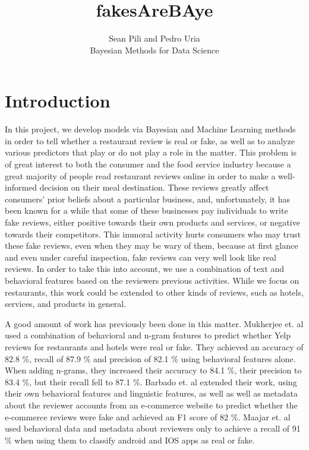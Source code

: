 \documentclass[man, floatsintext, 10pt]{apa6}
\title{fakesAreBAye}
\author{Sean Pili and Pedro Uria \\ Bayesian Methods for Data Science}
\affiliation{GWU}
\begin{document}
\maketitle

\section{Introduction}

In this project, we develop models via Bayesian and Machine Learning methods in order to tell whether a restaurant review is real or fake, as well as to analyze various predictors that play or do not play a role in the matter. This problem is of great interest to both the consumer and the food service industry because a great majority of people read restaurant reviews online in order to make a well-informed decision on their meal destination. These reviews greatly affect consumers' prior beliefs about a particular business, and, unfortunately, it has been known for a while that some of these businesses pay individuals to write fake reviews, either positive towards their own products and services, or negative towards their competitors. This immoral activity hurts consumers who may trust these fake reviews, even when they may be wary of them, because at first glance and even under careful inspection, fake reviews can very well look like real reviews. In order to take this into account, we use a combination of text and behavioral features based on the reviewers previous activities. While we focus on restaurants, this work could be extended to other kinds of reviews, such as hotels, services, and products in general.

A good amount of work has previously been done in this matter. Mukherjee et. al used a combination of behavioral and n-gram features to predict whether Yelp reviews for restaurants and hotels were real or fake. They achieved an accuracy of 82.8 \%, recall of 87.9 \% and precision of 82.1 \% using behavioral features alone. When adding n-grams, they increased their accuracy to 84.1 \%, their precision to 83.4 \%, but their recall fell to 87.1 \%. Barbado et. al extended their work, using their own behavioral features and linguistic features, as well as well as metadata about the reviewer accounts from an e-commerce website to predict whether the e-commerce reviews were fake and achieved an F1 score of 82 \%. Maajar et. al used behavioral data and metadata about reviewers only to achieve a recall of 91 \% when using them to classify android and IOS apps as real or fake. 
\end{document}
